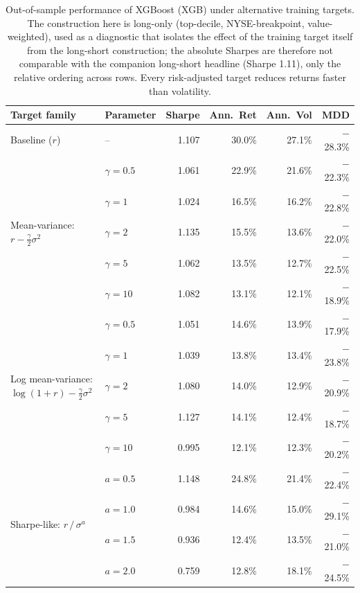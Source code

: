 \begin{table}[H]
\centering
\small
\begin{tabular}{l l r r r r}
\toprule
Target family & Parameter & Sharpe & Ann.\ Ret & Ann.\ Vol & MDD \\
\midrule
Baseline ($r$) & -- & 1.107 & 30.0\% & 27.1\% & $-$28.3\% \\
\midrule
\multirow{5}{*}{Mean-variance: $r - \frac{\gamma}{2}\sigma^2$}
 & $\gamma = 0.5$ & 1.061 & 22.9\% & 21.6\% & $-$22.3\% \\
 & $\gamma = 1$ & 1.024 & 16.5\% & 16.2\% & $-$22.8\% \\
 & $\gamma = 2$ & 1.135 & 15.5\% & 13.6\% & $-$22.0\% \\
 & $\gamma = 5$ & 1.062 & 13.5\% & 12.7\% & $-$22.5\% \\
 & $\gamma = 10$ & 1.082 & 13.1\% & 12.1\% & $-$18.9\% \\
\midrule
\multirow{5}{*}{Log mean-variance: $\log(1{+}r) - \frac{\gamma}{2}\sigma^2$}
 & $\gamma = 0.5$ & 1.051 & 14.6\% & 13.9\% & $-$17.9\% \\
 & $\gamma = 1$ & 1.039 & 13.8\% & 13.4\% & $-$23.8\% \\
 & $\gamma = 2$ & 1.080 & 14.0\% & 12.9\% & $-$20.9\% \\
 & $\gamma = 5$ & 1.127 & 14.1\% & 12.4\% & $-$18.7\% \\
 & $\gamma = 10$ & 0.995 & 12.1\% & 12.3\% & $-$20.2\% \\
\midrule
\multirow{4}{*}{Sharpe-like: $r\,/\,\sigma^a$}
 & $a = 0.5$ & 1.148 & 24.8\% & 21.4\% & $-$22.4\% \\
 & $a = 1.0$ & 0.984 & 14.6\% & 15.0\% & $-$29.1\% \\
 & $a = 1.5$ & 0.936 & 12.4\% & 13.5\% & $-$21.0\% \\
 & $a = 2.0$ & 0.759 & 12.8\% & 18.1\% & $-$24.5\% \\
\bottomrule
\end{tabular}
\caption{Out-of-sample performance of XGBoost (XGB) under alternative training targets. The construction here is long-only (top-decile, NYSE-breakpoint, value-weighted), used as a diagnostic that isolates the effect of the training target itself from the long-short construction; the absolute Sharpes are therefore not comparable with the companion long-short headline (Sharpe 1.11), only the relative ordering across rows. Every risk-adjusted target reduces returns faster than volatility.}
\label{tab:alt_targets}
\end{table}
